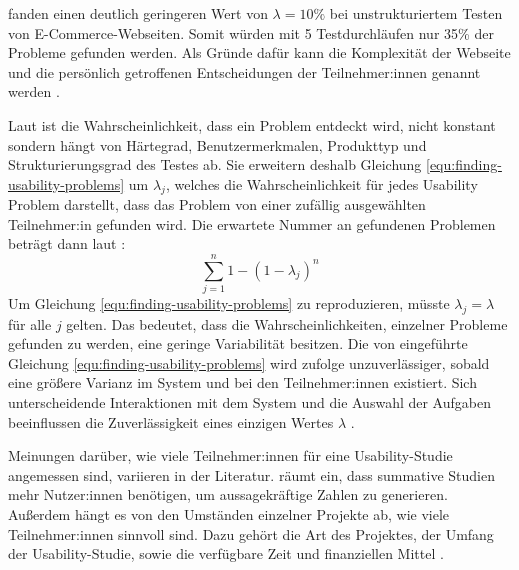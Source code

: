 \textcite{spoolTestingWeb2001} fanden einen deutlich geringeren Wert von $\lambda{}=10\%$ bei unstrukturiertem Testen von E-Commerce-Webseiten. Somit würden mit 5 Testdurchläufen nur 35\% der Probleme gefunden werden. Als Gründe dafür kann die Komplexität der Webseite und die persönlich getroffenen Entscheidungen der Teilnehmer:innen genannt werden \parencite{spoolTestingWeb2001}.

Laut \textcite{woolrychWhyWhen2001} ist die Wahrscheinlichkeit, dass ein Problem entdeckt wird, nicht konstant sondern hängt von Härtegrad, Benutzermerkmalen, Produkttyp und Strukturierungsgrad des Testes ab. Sie erweitern deshalb Gleichung \ref{equ:finding-usability-problems} um $\lambda{}_j$, welches die Wahrscheinlichkeit für jedes Usability Problem darstellt, dass das Problem von einer zufällig ausgewählten Teilnehmer:in gefunden wird. Die erwartete Nummer an gefundenen Problemen beträgt dann laut \textcite{woolrychWhyWhen2001}:
\begin{equation}
  \sum_{j=1}^n 1-(1-\lambda{}_j)^n
\end{equation}
Um Gleichung \ref{equ:finding-usability-problems} zu reproduzieren, müsste $\lambda{}_j = \lambda{}$ für alle $j$ gelten. Das bedeutet, dass die Wahrscheinlichkeiten, einzelner Probleme gefunden zu werden, eine geringe Variabilität besitzen. Die von \textcite{nielsenMathematicalModel1993} eingeführte Gleichung \ref{equ:finding-usability-problems} wird \textcite{woolrychWhyWhen2001} zufolge unzuverlässiger, sobald eine größere Varianz im System und bei den Teilnehmer:innen existiert. Sich unterscheidende Interaktionen mit dem System und die Auswahl der Aufgaben beeinflussen die Zuverlässigkeit eines einzigen Wertes $\lambda{}$ \parencite{woolrychWhyWhen2001}.

Meinungen darüber, wie viele Teilnehmer:innen für eine Usability-Studie angemessen sind, variieren in der Literatur. \textcite{nielsenHowMany2012} räumt ein, dass summative Studien mehr Nutzer:innen benötigen, um aussagekräftige Zahlen zu generieren. Außerdem hängt es von den Umständen einzelner Projekte ab, wie viele Teilnehmer:innen sinnvoll sind. Dazu gehört die Art des Projektes, der Umfang der Usability-Studie, sowie die verfügbare Zeit und finanziellen Mittel \parencite{nielsenHowMany2012}.
